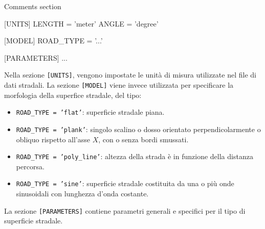 \begin{pseudoc}
	{ Comments section }
	
	[UNITS]
	LENGTH = 'meter'
	ANGLE = 'degree'
	
	[MODEL]
	ROAD\_TYPE = '...'
	
	[PARAMETERS]
	...
\end{pseudoc}

Nella sezione \texttt{[UNITS]}, vengono impostate le unità di misura utilizzate nel file di dati stradali. La sezione \texttt{[MODEL]} viene invece utilizzata per specificare la morfologia della superfice stradale, del tipo:
\begin{itemize}
	\item \texttt{ROAD\_TYPE = 'flat'}: superficie stradale piana.
	\item \texttt{ROAD\_TYPE = 'plank'}: singolo scalino o dosso orientato perpendicolarmente o obliquo rispetto all'asse $X$, con o senza bordi smussati.
	\item \texttt{ROAD\_TYPE = 'poly\_line'}: altezza della strada è in funzione della distanza percorsa.
	\item \texttt{ROAD\_TYPE = 'sine'}: superficie stradale costituita da una o più onde sinusoidali con lunghezza d'onda costante.
\end{itemize}
La sezione \texttt{[PARAMETERS]} contiene parametri generali e specifici per il tipo di superficie stradale.

